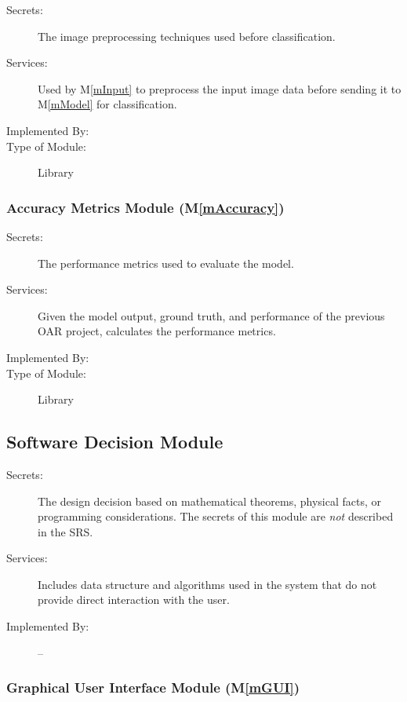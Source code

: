 \documentclass[12pt, titlepage]{article}
\newcommand{\mref}[1]{M\ref{#1}}
\begin{document}
\begin{description}
\item[Secrets:] The image preprocessing techniques used before classification.
\item[Services:] Used by \mref{mInput} to preprocess the input image data before
sending it to \mref{mModel} for classification.
\item[Implemented By:] \progname{}
\item[Type of Module:] Library
\end{description}

\subsubsection{Accuracy Metrics Module (\mref{mAccuracy})}

\begin{description}
\item[Secrets:] The performance metrics used to evaluate the model.
\item[Services:] Given the model output, ground truth, and performance of the
previous OAR project, calculates the performance metrics.
\item[Implemented By:] \progname{}
\item[Type of Module:] Library
\end{description}

\subsection{Software Decision Module}

\begin{description}
\item[Secrets:] The design decision based on mathematical theorems, physical
  facts, or programming considerations. The secrets of this module are
  \emph{not} described in the SRS.
\item[Services:] Includes data structure and algorithms used in the system that
  do not provide direct interaction with the user. 
\item[Implemented By:] --
\end{description}

\subsubsection{Graphical User Interface Module (\mref{mGUI})}
\end{document}
